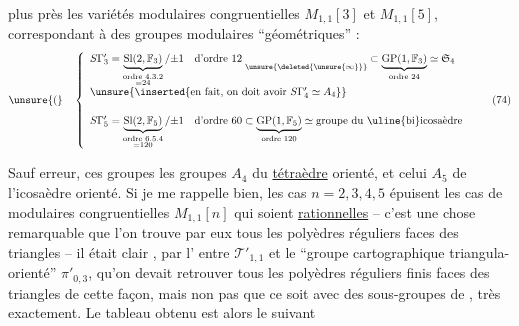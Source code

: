 
plus près les variétés modulaires congruentielles
$M_{1,1}[3]$ et $M_{1,1}[5]$, correspondant à des
groupes modulaires ``géométriques'' :
\[
\unsure{(}\quad
\left\{
\begin{array}{l}
S\Gamma'_3 = \underbrace{\mathrm{Sl}(2,\mathbb F_3)}_{\substack{\text{ordre }4.3.2\\=24}}/\mathord{\pm}1
\quad \text{d'ordre }12\;\underset{\unsure{\deleted{\unsure{\infty}}}}{\phantom{a}}
\subset \underbrace{\mathrm{GP}(1,\mathbb F_3)}_{\text{ordre }24}\simeq\mathfrak S_4
\\[1.5em]
\unsure{\inserted{\text{en fait, on doit avoir } S\Gamma'_4\simeq A_4}}
\\[1.5em]
S\Gamma'_5 = \underbrace{\mathrm{Sl}(2,\mathbb F_5)}_{\substack{\text{ordre }6.5.4\\=120}}/\mathord{\pm}1
\quad \text{d'ordre }60
\subset \underbrace{\mathrm{GP}(1,\mathbb F_5)}_{\text{ordre }120}\simeq\text{groupe du \uline{bi}icosaèdre}
\end{array}
\right.
\tag{74}
\]

Sauf erreur, ces groupes   les groupes $A_4$ du
\uline{tétraèdre} orienté, et celui $A_5$ de l'icosaèdre
orienté. Si je me rappelle bien, les cas
$n=2,3,4,5$ épuisent les cas de  modulaires
congruentielles $M_{1,1}[n]$ qui soient \uline{rationnelles}
-- c'est une chose remarquable que l'on trouve
par eux tous les polyèdres réguliers   faces des
triangles  -- il était clair , par l' entre
$\mathcal T'_{1,1}$ et le ``groupe cartographique triangula- orienté'' $\pi'_{0,3}$,
qu'on devait retrouver tous
les polyèdres réguliers finis  faces des
triangles de cette façon, mais non pas que
ce soit avec des sous-groupes de ,
très exactement. Le tableau obtenu est
alors le suivant


